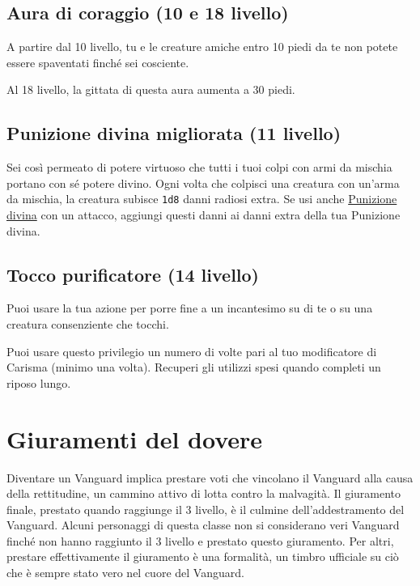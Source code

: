 \documentclass[a4paper,10pt,twoside,twocolumn,openany,bg=full,nodeprecatedcode]{dndbook}
\begin{document}
\subsection{Aura di coraggio (10\degree{} e 18\degree{} livello)}\label{Vanguard_aura_of_courage}
A partire dal 10\degree{} livello, tu e le creature amiche entro 10 piedi da te non potete essere spaventati finché sei cosciente.

Al 18\degree{} livello, la gittata di questa aura aumenta a 30 piedi.

\subsection{Punizione divina migliorata (11\degree{} livello)}\label{Vanguard_improved_divine_smite}
Sei così permeato di potere virtuoso che tutti i tuoi colpi con armi da mischia portano con sé potere divino. Ogni volta che colpisci una creatura con un'arma da mischia, la creatura subisce \texttt{1d8} danni radiosi extra. Se usi anche \hyperref[Vanguard_divine_smite]{Punizione divina} con un attacco, aggiungi questi danni ai danni extra della tua Punizione divina.

\subsection{Tocco purificatore (14\degree{} livello)}\label{Vanguard_cleansing_touch}
Puoi usare la tua azione per porre fine a un incantesimo su di te o su una creatura consenziente che tocchi.

Puoi usare questo privilegio un numero di volte pari al tuo modificatore di Carisma (minimo una volta). Recuperi gli utilizzi spesi quando completi un riposo lungo.

\section{Giuramenti del dovere}\label{Vanguard_oath_of_duty_list}
Diventare un Vanguard implica prestare voti che vincolano il Vanguard alla causa della rettitudine, un cammino attivo di lotta contro la malvagità. Il giuramento finale, prestato quando raggiunge il 3\degree{} livello, è il culmine dell'addestramento del Vanguard. Alcuni personaggi di questa classe non si considerano veri Vanguard finché non hanno raggiunto il 3\degree{} livello e prestato questo giuramento. Per altri, prestare effettivamente il giuramento è una formalità, un timbro ufficiale su ciò che è sempre stato vero nel cuore del Vanguard.
\end{document}
